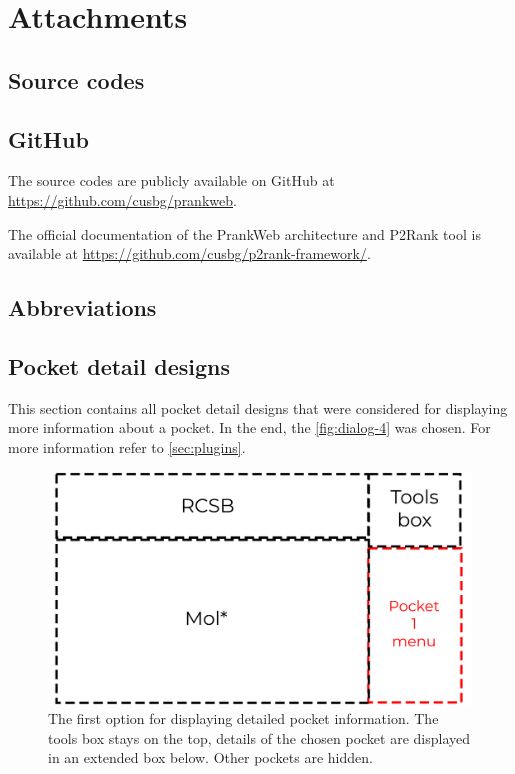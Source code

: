 \chapter{Attachments}

\section{Source codes}
\label{sec:source_codes}

\section{GitHub}
\label{sec:github}

The source codes are publicly available on GitHub at \url{https://github.com/cusbg/prankweb}.

The official documentation of the PrankWeb architecture and P2Rank tool is available at \url{https://github.com/cusbg/p2rank-framework/}.

\section{Abbreviations}
\label{sec:abbreviations}

\section{Pocket detail designs}
\label{sec:pocket_detail_designs}

This section contains all pocket detail designs that were considered for displaying more information about a pocket. In the end, the \cref{fig:dialog-4} was chosen. For more information refer to \cref{sec:plugins}.

\begin{figure}[htb]
    \centering
    \includegraphics[width=\linewidth]{img/dialog_1-svg.pdf}
    \caption{The first option for displaying detailed pocket information. The tools box stays on the top, details of the chosen pocket are displayed in an extended box below. Other pockets are hidden.}
    \label{fig:dialog-1}
\end{figure}

